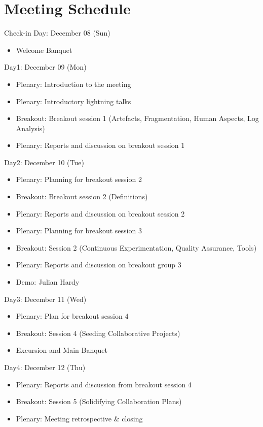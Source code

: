 \documentclass[a4paper]{article}
\begin{document}
\clearpage

\section{Meeting Schedule}

\begin{bfseries}
Check-in Day: December 08 (Sun)
\end{bfseries}
\begin{itemize}
\item Welcome Banquet
\end{itemize}
\begin{bfseries}
{Day1: December 09 (Mon)}
\end{bfseries}
\begin{itemize}
\item Plenary: Introduction to the meeting
\item Plenary: Introductory lightning talks
\item Breakout: Breakout session 1 (Artefacts, Fragmentation, Human Aspects, Log Analysis)
\item Plenary: Reports and discussion on breakout session 1
\end{itemize}
\begin{bfseries}
Day2: December 10 (Tue)
\end{bfseries}
\begin{itemize}
\item Plenary: Planning for breakout session 2 
\item Breakout: Breakout session 2 (Definitions)
\item Plenary: Reports and discussion on breakout session 2
\item Plenary: Planning for breakout session 3
\item Breakout: Session 2 (Continuous Experimentation, Quality Assurance, Tools)
\item Plenary: Reports and discussion on breakout group 3
\item Demo: Julian Hardy
\end{itemize}
\begin{bfseries}
Day3: December 11 (Wed)
\end{bfseries}
\begin{itemize}
\item Plenary: Plan for breakout session 4
\item Breakout: Session 4 (Seeding Collaborative Projects)
\item Excursion and Main Banquet
\end{itemize}
\begin{bfseries}
Day4: December 12 (Thu)
\end{bfseries}
\begin{itemize}
\item Plenary: Reports and discussion from breakout session 4
\item Breakout: Session 5 (Solidifying Collaboration Plans)
\item Plenary: Meeting retrospective \& closing
\end{itemize}
\end{document}
